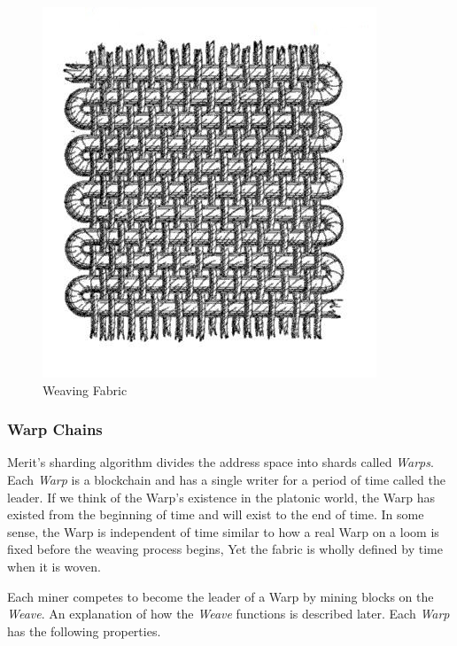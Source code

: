 \documentclass{article}
\begin{document}
\begin{figure}[H]
    \begin{center}
        \includegraphics[scale=0.618]{fabric}
    \end{center}
    \caption{Weaving Fabric \cite{weave}}
\end{figure}

\subsubsection{Warp Chains}

Merit's sharding algorithm divides the address space into shards
called \emph{Warps}.  Each \emph{Warp} is a blockchain and has a single writer
for a period of time called the leader.  If we think of the Warp's existence in 
the platonic world, the Warp has existed from the beginning of time and will 
exist to the end of time.  In some sense, the Warp is independent of time similar
to how a real Warp on a loom is fixed before the weaving process begins, Yet the
fabric is wholly defined by time when it is woven.

Each miner competes to become the leader of a Warp by mining blocks on the \emph{Weave}.  An explanation of how the \emph{Weave} functions is described later.  Each \emph{Warp} has the following properties.
\end{document}
